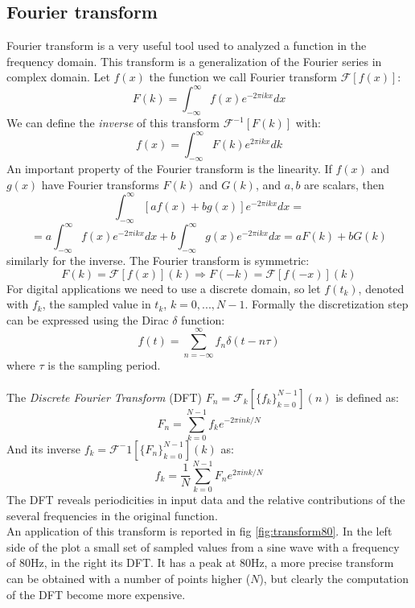 \subsection{Fourier transform}
Fourier transform is a very useful tool used to analyzed a function in the frequency domain. This transform is a generalization of the Fourier series in complex domain. Let $f(x)$ the function we call 
Fourier transform $\mathcal{F}[f(x)]$:
\begin{equation}
F(k)	=	\int_{-\infty}^\infty f(x)e^{-2\pi i k x}dx
\end{equation}
We can define the \textit{inverse} of this transform $\mathcal{F}^{-1}[F(k)]$ with:
\begin{equation}
 f(x) =	\int_{-\infty}^\infty F(k)e^{2\pi i k x}dk
\end{equation}
An important property of the Fourier transform is the linearity. If $f(x)$ and $g(x)$ have Fourier transforms $F(k)$ and $G(k)$, and $a,b$ are scalars, then
\[\int_{-\infty}^\infty [af(x)+bg(x)]e^{-2\pi i k x}dx=\]
\begin{equation}
= a \int_{-\infty}^\infty f(x)e^{-2\pi i k x}dx + b \int_{-\infty}^\infty g(x)e^{-2\pi i k x}dx = aF(k) + bG(k)
\end{equation}
similarly for the inverse. The Fourier transform is symmetric:
\[ F(k) = \mathcal{F}[f(x)](k) \Rightarrow F(-k) = \mathcal{F}[f(-x)](k) \]
For digital applications we need to use a discrete domain, so let $f(t_k)$, denoted with $f_k$, the sampled value in $t_k$, $k=0,...,N-1$. Formally the discretization step can be expressed using the Dirac $\delta$ function:
\[ f(t) = \sum_{n=-\infty}^{\infty} f_n \delta (t-n\tau)\]
where $\tau$ is the sampling period.\\\\
The \textit{Discrete Fourier Transform} (DFT) $F_n = \mathcal{F}_k[\{f_k\}_{k=0}^{N-1}](n)$ is defined as:
\begin{equation}
 F_n = \sum_{k=0}^{N-1} f_k e^{-2 \pi i n k/N}
\end{equation}
And its inverse $f_k = \mathcal{F}^-1[\{F_n\}_{k=0}^{N-1}](k)$ as:
\begin{equation}
f_k =\frac{1}{N} \sum_{k=0}^{N-1} F_n e^{2 \pi i n k/N}
\end{equation}
The DFT reveals periodicities in input data and the relative contributions of the several frequencies in the original function.\\ 
An application of this transform is reported in fig \ref{fig:transform80}. In the left side of the plot a small set of sampled values from a sine wave with a frequency of $80$Hz, in the right its DFT. It has a peak at $80$Hz, a more precise transform can be obtained with a number of points higher ($N$), but clearly the computation of the DFT become more expensive.
